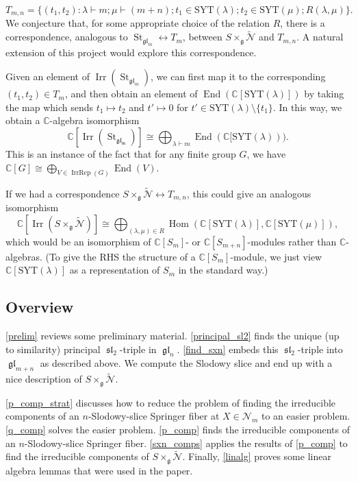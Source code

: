 \documentclass[12pt,psamsfonts]{article}
\DeclareMathOperator{\End}{End}
\DeclareMathOperator{\gl}{\mathfrak{gl}}
\DeclareMathOperator{\spl}{\mathfrak{sl}}
\DeclareMathOperator{\irrrep}{IrrRep}
\DeclareMathOperator{\Irr}{Irr}
\DeclareMathOperator{\Hom}{Hom}
\DeclareMathOperator{\St}{St}
\begin{document}
\[T_{m,n} = \{(t_1, t_2) : \lambda \vdash m; \mu \vdash (m + n); t_1 \in \mathrm{SYT}(\lambda); t_2 \in \mathrm{SYT}(\mu); R(\lambda, \mu)\}.\]
We conjecture that, for some appropriate choice of the relation \(R\), there is a correspondence, analogous to \(\St_{\gl_m} \leftrightarrow T_m\), between \(S \times_\mathfrak{g} \widetilde{\mathcal{N}}\) and \(T_{m,n}\).
A natural extension of this project would explore this correspondence.
\par Given an element of \(\Irr(\St_{\gl_m})\), we can first map it to the corresponding \((t_1, t_2) \in T_m\), and then obtain an element of \(\End(\mathbb{C}[\mathrm{SYT}(\lambda)])\) by taking the map which sends \(t_1 \mapsto t_2\) and \(t' \mapsto 0\) for \(t' \in \mathrm{SYT}(\lambda) \setminus \{t_1\}\).
In this way, we obtain a \(\mathbb{C}\)-algebra isomorphism
\[\mathbb{C}[\Irr(\St_{\mathfrak{\gl_m}})] \cong \bigoplus_{\lambda \vdash m} \End(\mathbb{C}[\mathrm{SYT}(\lambda))).\]
This is an instance of the fact that for any finite group \(G\), we have \(\mathbb{C}[G] \cong \bigoplus_{V \in \irrrep(G)} \End(V)\).
\par If we had a correspondence \(S \times_\mathfrak{g} \widetilde{\mathcal{N}} \leftrightarrow T_{m,n}\), this could give an analogous isomorphism 
\[\mathbb{C}[\Irr(S \times_\mathfrak{g} \widetilde{\mathcal{N}})] \cong \bigoplus_{(\lambda, \mu) \in R} \Hom(\mathbb{C}[\mathrm{SYT}(\lambda)], \mathbb{C}[\mathrm{SYT}(\mu)]),\]
which would be an isomorphism of \(\mathbb{C}[S_m]\)- or \(\mathbb{C}[S_{m + n}]\)-modules rather than \(\mathbb{C}\)-algebras.
(To give the RHS the structure of a \(\mathbb{C}[S_m]\)-module, we just view \(\mathbb{C}[\mathrm{SYT}(\lambda)]\) as a representation of \(S_m\) in the standard way.)

\subsection{Overview}
\par \cref{prelim} reviews some preliminary material.
\cref{principal_sl2} finds the unique (up to similarity) principal \(\spl_2\)-triple in \(\gl_n\).
\cref{find_sxn} embeds this \(\spl_2\)-triple into \(\gl_{m + n}\) as described above.
We compute the Slodowy slice and end up with a nice description of \(S \times_\mathfrak{g} \widetilde{\mathcal{N}}\).
\par \cref{p_comp_strat} discusses how to reduce the problem of finding the irreducible components of an \(n\)-Slodowy-slice Springer fiber at \(X \in \mathcal{N}_m\) to an easier problem.
\cref{q_comp} solves the easier problem.
\cref{p_comp} finds the irreducible components of an \(n\)-Slodowy-slice Springer fiber.
\cref{sxn_comps} applies the results of \cref{p_comp} to find the irreducible components of \(S \times_\mathfrak{g} \widetilde{\mathcal{N}}\).
Finally, \cref{linalg} proves some linear algebra lemmas that were used in the paper.
\end{document}
